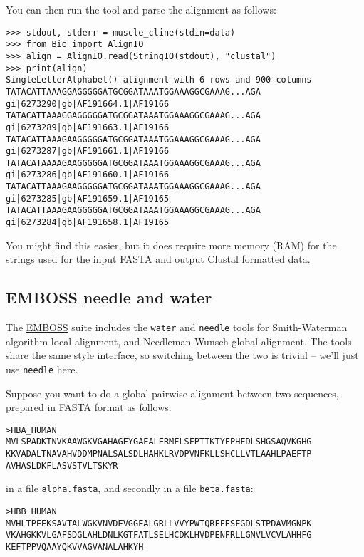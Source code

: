\documentclass{report}
\begin{document}
\noindent You can then run the tool and parse the alignment as follows:

\begin{verbatim}
>>> stdout, stderr = muscle_cline(stdin=data)
>>> from Bio import AlignIO
>>> align = AlignIO.read(StringIO(stdout), "clustal")
>>> print(align)
SingleLetterAlphabet() alignment with 6 rows and 900 columns
TATACATTAAAGGAGGGGGATGCGGATAAATGGAAAGGCGAAAG...AGA gi|6273290|gb|AF191664.1|AF19166
TATACATTAAAGGAGGGGGATGCGGATAAATGGAAAGGCGAAAG...AGA gi|6273289|gb|AF191663.1|AF19166
TATACATTAAAGAAGGGGGATGCGGATAAATGGAAAGGCGAAAG...AGA gi|6273287|gb|AF191661.1|AF19166
TATACATAAAAGAAGGGGGATGCGGATAAATGGAAAGGCGAAAG...AGA gi|6273286|gb|AF191660.1|AF19166
TATACATTAAAGAAGGGGGATGCGGATAAATGGAAAGGCGAAAG...AGA gi|6273285|gb|AF191659.1|AF19165
TATACATTAAAGAAGGGGGATGCGGATAAATGGAAAGGCGAAAG...AGA gi|6273284|gb|AF191658.1|AF19165
\end{verbatim}

You might find this easier, but it does require more memory (RAM) for the strings
used for the input FASTA and output Clustal formatted data.

\subsection{EMBOSS needle and water}
\label{seq:emboss-needle-water}
The \href{http://emboss.sourceforge.net/}{EMBOSS} suite includes the \texttt{water} and
\texttt{needle} tools for Smith-Waterman algorithm local alignment, and Needleman-Wunsch
global alignment. The tools share the same style interface, so switching between the two
is trivial -- we'll just use \texttt{needle} here.

Suppose you want to do a global pairwise alignment between two sequences, prepared in
FASTA format as follows:

\begin{verbatim}
>HBA_HUMAN
MVLSPADKTNVKAAWGKVGAHAGEYGAEALERMFLSFPTTKTYFPHFDLSHGSAQVKGHG
KKVADALTNAVAHVDDMPNALSALSDLHAHKLRVDPVNFKLLSHCLLVTLAAHLPAEFTP
AVHASLDKFLASVSTVLTSKYR
\end{verbatim}

\noindent in a file \texttt{alpha.fasta}, and secondly in a file \texttt{beta.fasta}:

\begin{verbatim}
>HBB_HUMAN
MVHLTPEEKSAVTALWGKVNVDEVGGEALGRLLVVYPWTQRFFESFGDLSTPDAVMGNPK
VKAHGKKVLGAFSDGLAHLDNLKGTFATLSELHCDKLHVDPENFRLLGNVLVCVLAHHFG
KEFTPPVQAAYQKVVAGVANALAHKYH
\end{verbatim}
\end{document}
